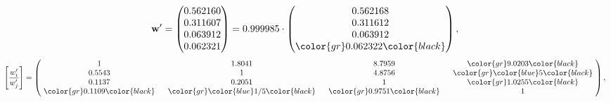 \begin{example}
\begin{equation*}
\mathbf{w}^{\prime} =
\begin{pmatrix}
0.562160\\
0.311607\\
0.063912\\
0.062321
\end{pmatrix} =
0.999985\cdot
\begin{pmatrix}
0.562168\\
0.311612\\
0.063912\\
\color{gr} 0.062322\color{black}
\end{pmatrix},
\end{equation*}
\begin{equation*}
\left[ \frac{{w}^{\prime}_i}{{w}^{\prime}_j} \right] =
\begin{pmatrix}
$\,\,$ 1 $\,\,$ & $\,\,$1.8041$\,\,$ & $\,\,$8.7959$\,\,$ & $\,\,$\color{gr} 9.0203\color{black} $\,\,$ \\
$\,\,$0.5543$\,\,$ & $\,\,$ 1 $\,\,$ & $\,\,$4.8756$\,\,$ & $\,\,$\color{gr} \color{blue} 5\color{black}   $\,\,$ \\
$\,\,$0.1137$\,\,$ & $\,\,$0.2051$\,\,$ & $\,\,$ 1 $\,\,$ & $\,\,$\color{gr} 1.0255\color{black}  $\,\,$ \\
$\,\,$\color{gr} 0.1109\color{black} $\,\,$ & $\,\,$\color{gr} \color{blue}  1/5\color{black} $\,\,$ & $\,\,$\color{gr} 0.9751\color{black} $\,\,$ & $\,\,$ 1  $\,\,$ \\
\end{pmatrix},
\end{equation*}
\end{example}
\newpage
